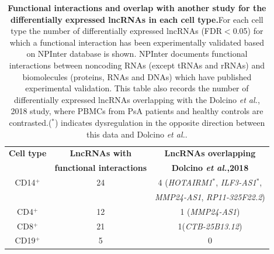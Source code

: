 \begin{table}[htbp]
\centering
\begin{tabular}{@{} c c c}
\toprule
\textbf{Cell type}   & \textbf{LncRNAs with}             &\textbf{LncRNAs overlapping}  \\
                     & \textbf{functional interactions}  &\textbf{Dolcino \textit{et al.},2018}   \\
\midrule
\midrule
CD14$^+$             & 24  & 4 (\textit{HOTAIRM1}$^{\ast}$, \textit{ILF3-AS1}$^{\ast}$, \\
                     &     & \textit{MMP24-AS1}, \textit{RP11-325F22.2})\\                 
CD4$^+$             & 12  & 1 (\textit{MMP24-AS1}) \\
CD8$^+$             & 21  & 1(\textit{CTB-25B13.12})\\
CD19$^+$             & 5   & 0\\
\bottomrule 
\end{tabular}
\medskip %
\caption[Functional interactions and overlap with another study for the differentially expressed lncRNAs in each cell type.]{\textbf{Functional interactions and overlap with another study for the differentially expressed lncRNAs in each cell type.}For each cell type the number of differentially expressed lncRNAs (FDR$<$0.05) for which a functional interaction has been experimentally validated based on NPInter database is shown. NPInter documents functional interactions between noncoding RNAs (except tRNAs and rRNAs) and biomolecules (proteins, RNAs and DNAs) which have published experimental validation. This table also records the number of differentially expressed lncRNAs overlapping with the Dolcino \textit{et al.}, 2018 study, where PBMCs from PsA patients and healthy controls are contrasted.($^{\ast}$) indicates dysregulation in the opposite direction between this data and Dolcino \textit{et al.}.}
\label{tab:RNAseq_PS_CTL_lncRNAs_annotation}
\end{table}
\bigskip %

